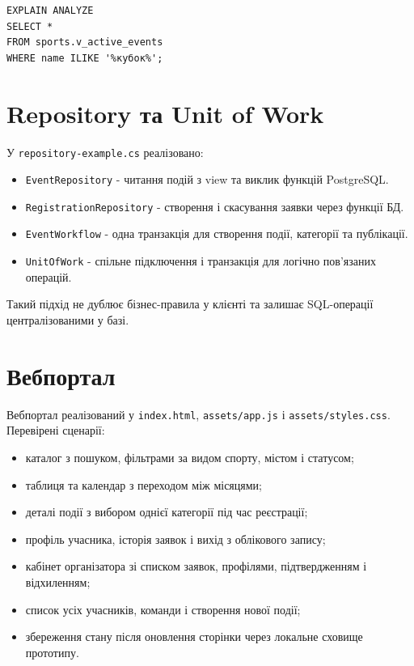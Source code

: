 \documentclass[12pt,a4paper]{article}
\begin{document}
\begin{lstlisting}
EXPLAIN ANALYZE
SELECT *
FROM sports.v_active_events
WHERE name ILIKE '%кубок%';
\end{lstlisting}

\section{Repository та Unit of Work}

У \texttt{repository-example.cs} реалізовано:

\begin{itemize}
\item \texttt{EventRepository} - читання подій з view та виклик функцій PostgreSQL.
\item \texttt{RegistrationRepository} - створення і скасування заявки через функції БД.
\item \texttt{EventWorkflow} - одна транзакція для створення події, категорії та публікації.
\item \texttt{UnitOfWork} - спільне підключення і транзакція для логічно пов'язаних операцій.
\end{itemize}

Такий підхід не дублює бізнес-правила у клієнті та залишає SQL-операції централізованими у базі.

\section{Вебпортал}

Вебпортал реалізований у \texttt{index.html}, \texttt{assets/app.js} і \texttt{assets/styles.css}. Перевірені сценарії:

\begin{itemize}
\item каталог з пошуком, фільтрами за видом спорту, містом і статусом;
\item таблиця та календар з переходом між місяцями;
\item деталі події з вибором однієї категорії під час реєстрації;
\item профіль учасника, історія заявок і вихід з облікового запису;
\item кабінет організатора зі списком заявок, профілями, підтвердженням і відхиленням;
\item список усіх учасників, команди і створення нової події;
\item збереження стану після оновлення сторінки через локальне сховище прототипу.
\end{itemize}
\end{document}
